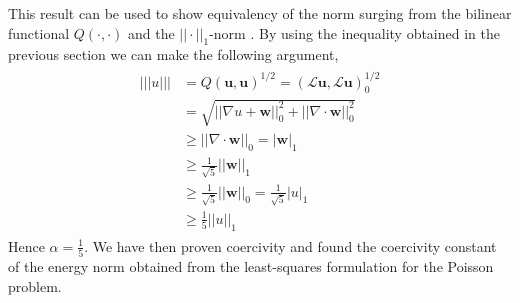 This result can be used to show equivalency of the norm surging from the bilinear functional $Q(\cdot,\cdot)$ and the $|| \cdot ||_1$-norm . 
By using the inequality obtained in the previous section we can make the following argument,
\begin{align}
	\begin{split}
	|||u||| 
	&=Q(\mathbf{u},\mathbf{u})^{1/2} 
	= (\mathcal{L}\mathbf{u},\mathcal{L}\mathbf{u})_0^{1/2} \\
	&= \sqrt{||\nabla u+\mathbf{w}||^2_0+||\nabla \cdot \mathbf{w}||^2_0}\\
	&\geq ||\nabla \cdot \mathbf{w}||_0
	= |\mathbf{w}|_1 \\
	&\geq \frac{1}{\sqrt{5}}||\mathbf{w}||_1\\
	&\geq \frac{1}{\sqrt{5}}||\mathbf{w}||_0
	= \frac{1}{\sqrt{5}}|u|_1\\
	&\geq \frac{1}{5}||u||_1
	\end{split}
	\label{eq:resultAlpha}
\end{align}
Hence $\alpha=\frac{1}{5}$. We have then proven coercivity and found the coercivity constant of the energy norm obtained from the least-squares formulation for the Poisson problem.  
%
